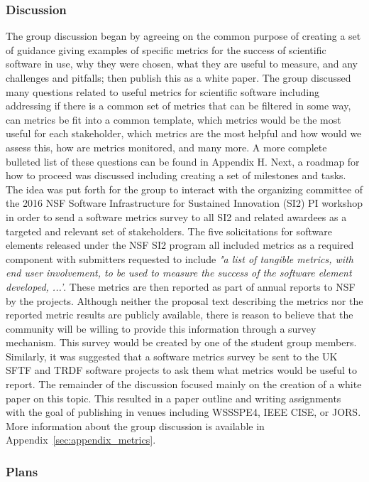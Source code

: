 \subsubsection{Discussion}

The group discussion began by agreeing on the common purpose of creating a set
of guidance giving examples of specific metrics for the success of scientific
software in use, why they were chosen, what they are useful to measure, and any
challenges and pitfalls; then publish this as a white paper. The group discussed
many questions related to useful metrics for scientific software including
addressing if there is a common set of metrics that can be filtered in some way,
can metrics be fit into a common template, which metrics would be the most
useful for each stakeholder, which metrics are the most helpful and how would we
assess this, how are metrics monitored, and many more. A more complete bulleted
list of these questions can be found in Appendix H. Next, a roadmap for how to
proceed was discussed including creating a set of milestones and tasks. The idea
was put forth for the group to interact with the organizing committee of the
2016 NSF Software Infrastructure for Sustained Innovation (SI2) PI workshop in
order to send a software metrics survey to all SI2 and related awardees as a
targeted and relevant set of stakeholders. The five solicitations for software
elements released under the NSF SI2 program all included metrics as a required
component with submitters requested to include {\it "a list of tangible metrics,
with end user involvement, to be used to measure the success of the software
element developed, ...'}. These metrics are then reported as part of annual
reports to NSF by the projects. Although neither the proposal text describing
the metrics nor the reported metric results are publicly available, there is
reason to believe that the community will be willing to provide this information
through a survey mechanism. This survey would be created by one of the student
group members. Similarly, it was suggested that a software metrics survey be
sent to the UK SFTF and TRDF software projects to ask them what metrics would be
useful to report. The remainder of the discussion focused mainly on the creation
of a white paper on this topic. This resulted in a paper outline and writing
assignments with the goal of publishing in venues including WSSSPE4, IEEE CISE,
or JORS. More information about the group discussion is available in
Appendix~\ref{sec:appendix_metrics}.

\subsubsection{Plans}

